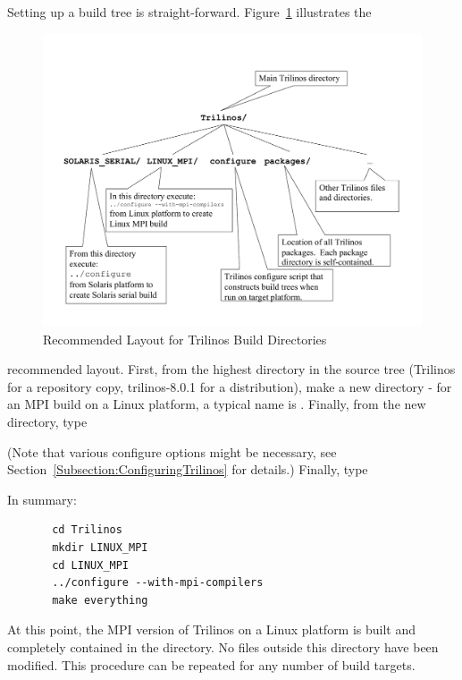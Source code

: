 Setting up a build tree is straight-forward.
Figure~\ref{Figure:TrilinosDirectoryStructure} illustrates the
\begin{figure}
\begin{center}
\includegraphics[width=6in]{../CommonFiles/TrilinosDirectoryStructure}
\end{center}
\caption{\label{Figure:TrilinosDirectoryStructure}Recommended Layout for Trilinos Build Directories}
\end{figure}recommended layout.  First, from the highest
directory in the source tree (Trilinos for a repository copy, trilinos-8.0.1
for a distribution), make a new directory - for an MPI build
on a Linux platform, a
typical name is .
Finally, from the new directory, type


(Note that various configure options might be necessary, see Section~\ref{Subsection:ConfiguringTrilinos} for details.)  Finally, type



In summary:

\begin{verbatim}
       cd Trilinos
       mkdir LINUX_MPI
       cd LINUX_MPI
       ../configure --with-mpi-compilers
       make everything
\end{verbatim}
At this point, the MPI version of Trilinos on a Linux platform is
built and completely contained in the 
directory.  No files outside this directory have been modified.  This
procedure can be repeated for any number of build targets.

